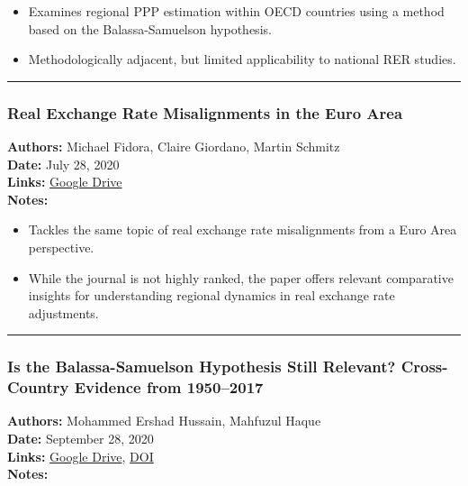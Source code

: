 \documentclass[
  11pt,
]{article}
\providecommand{\tightlist}{%
  \setlength{\itemsep}{0pt}\setlength{\parskip}{0pt}}
\begin{document}
\begin{itemize}
\tightlist
\item
  Examines regional PPP estimation within OECD countries using a method
  based on the Balassa-Samuelson hypothesis.
\item
  Methodologically adjacent, but limited applicability to national RER
  studies.
\end{itemize}

\begin{center}\rule{0.5\linewidth}{0.5pt}\end{center}

\subsubsection{Real Exchange Rate Misalignments in the Euro
Area}\label{real-exchange-rate-misalignments-in-the-euro-area}

\textbf{Authors:} Michael Fidora, Claire Giordano, Martin Schmitz\\
\textbf{Date:} July 28, 2020\\
\textbf{Links:}
\href{https://drive.google.com/file/d/1r1e4j018-tVvMPwVqttye_ftEfZTTNsj/view?usp=sharing}{Google
Drive}\\
\textbf{Notes:}

\begin{itemize}
\tightlist
\item
  Tackles the same topic of real exchange rate misalignments from a Euro
  Area perspective.
\item
  While the journal is not highly ranked, the paper offers relevant
  comparative insights for understanding regional dynamics in real
  exchange rate adjustments.
\end{itemize}

\begin{center}\rule{0.5\linewidth}{0.5pt}\end{center}

\subsubsection{Is the Balassa-Samuelson Hypothesis Still Relevant?
Cross-Country Evidence from
1950--2017}\label{is-the-balassa-samuelson-hypothesis-still-relevant-cross-country-evidence-from-19502017}

\textbf{Authors:} Mohammed Ershad Hussain, Mahfuzul Haque\\
\textbf{Date:} September 28, 2020\\
\textbf{Links:}
\href{https://drive.google.com/file/d/1UOk4LsRAddTO--0tr4ulynOaXQht7Agv/view?usp=sharing}{Google
Drive}, \href{https://doi.org/10.1453/jepe.v7i3.2096}{DOI}\\
\textbf{Notes:}
\end{document}
